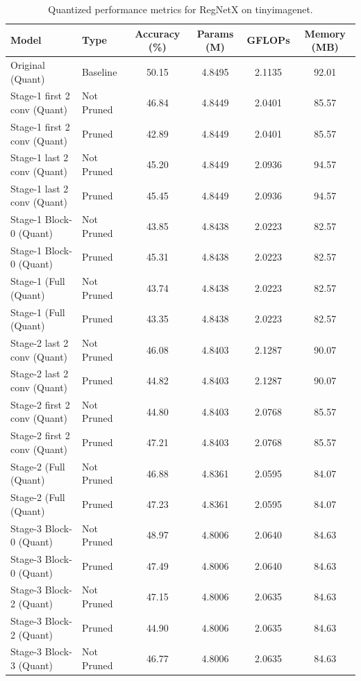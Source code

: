 \begin{table}
\caption{Quantized performance metrics for RegNetX on tinyimagenet.}
\label{tab:RegNetX_tinyimagenet_quant}
\begin{tabular}{llcccc}
\toprule
Model & Type & Accuracy (\%) & Params (M) & GFLOPs & Memory (MB) \\
\midrule
Original
(Quant) & Baseline & 50.15 & 4.8495 & 2.1135 & 92.01 \\
Stage-1 first 2 conv
(Quant) & Not Pruned & 46.84 & 4.8449 & 2.0401 & 85.57 \\
Stage-1 first 2 conv
(Quant) & Pruned & 42.89 & 4.8449 & 2.0401 & 85.57 \\
Stage-1 last 2 conv
(Quant) & Not Pruned & 45.20 & 4.8449 & 2.0936 & 94.57 \\
Stage-1 last 2 conv
(Quant) & Pruned & 45.45 & 4.8449 & 2.0936 & 94.57 \\
Stage-1 Block-0
(Quant) & Not Pruned & 43.85 & 4.8438 & 2.0223 & 82.57 \\
Stage-1 Block-0
(Quant) & Pruned & 45.31 & 4.8438 & 2.0223 & 82.57 \\
Stage-1 (Full
(Quant) & Not Pruned & 43.74 & 4.8438 & 2.0223 & 82.57 \\
Stage-1 (Full
(Quant) & Pruned & 43.35 & 4.8438 & 2.0223 & 82.57 \\
Stage-2 last 2 conv
(Quant) & Not Pruned & 46.08 & 4.8403 & 2.1287 & 90.07 \\
Stage-2 last 2 conv
(Quant) & Pruned & 44.82 & 4.8403 & 2.1287 & 90.07 \\
Stage-2 first 2 conv
(Quant) & Not Pruned & 44.80 & 4.8403 & 2.0768 & 85.57 \\
Stage-2 first 2 conv
(Quant) & Pruned & 47.21 & 4.8403 & 2.0768 & 85.57 \\
Stage-2 (Full
(Quant) & Not Pruned & 46.88 & 4.8361 & 2.0595 & 84.07 \\
Stage-2 (Full
(Quant) & Pruned & 47.23 & 4.8361 & 2.0595 & 84.07 \\
Stage-3 Block-0
(Quant) & Not Pruned & 48.97 & 4.8006 & 2.0640 & 84.63 \\
Stage-3 Block-0
(Quant) & Pruned & 47.49 & 4.8006 & 2.0640 & 84.63 \\
Stage-3 Block-2
(Quant) & Not Pruned & 47.15 & 4.8006 & 2.0635 & 84.63 \\
Stage-3 Block-2
(Quant) & Pruned & 44.90 & 4.8006 & 2.0635 & 84.63 \\
Stage-3 Block-3
(Quant) & Not Pruned & 46.77 & 4.8006 & 2.0635 & 84.63 \\

\end{tabular}
\end{table}
